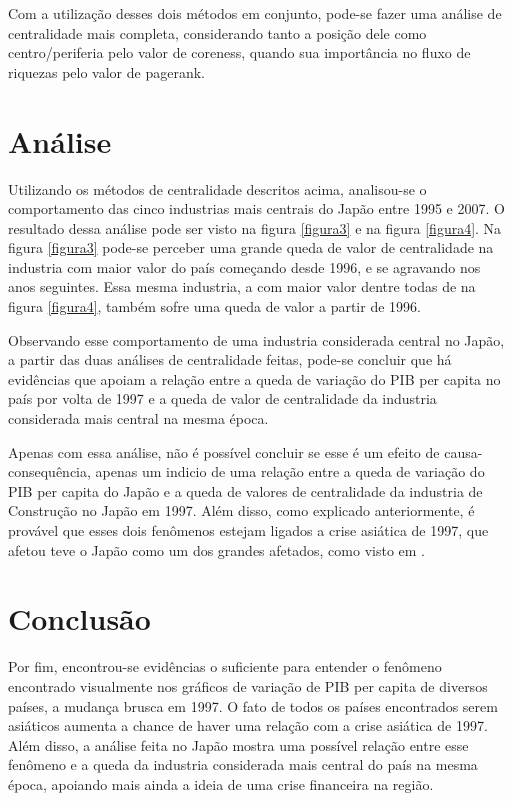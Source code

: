 \documentclass[12pt]{article}
\begin{document}
Com a utilização desses dois métodos em conjunto, pode-se fazer uma análise de centralidade mais completa, considerando tanto a posição dele como centro/periferia pelo valor de coreness, quando sua importância no fluxo de riquezas pelo valor de pagerank.

\section{Análise}

Utilizando os métodos de centralidade descritos acima, analisou-se o comportamento das cinco industrias mais centrais do Japão entre 1995 e 2007. O resultado dessa análise pode ser visto na figura \ref{figura3} e na figura \ref{figura4}. Na figura \ref{figura3} pode-se perceber uma grande queda de valor de centralidade na industria com maior valor do país começando desde 1996, e se agravando nos anos seguintes. Essa mesma industria, a com maior valor dentre todas de na figura \ref{figura4}, também sofre uma queda de valor a partir de 1996. 

Observando esse comportamento de uma industria considerada central no Japão, a partir das duas análises de centralidade feitas, pode-se concluir que há evidências que apoiam a relação entre a queda de variação do PIB per capita no país por volta de 1997 e a queda de valor de centralidade da industria considerada mais central na mesma época.

Apenas com essa análise, não é possível concluir se esse é um efeito de causa-consequência, apenas um indicio de uma relação entre a queda de variação do PIB per capita do Japão e a queda de valores de centralidade da industria de Construção no Japão em 1997. Além disso, como explicado anteriormente, é provável que esses dois fenômenos estejam ligados a crise asiática de 1997, que afetou teve o Japão como um dos grandes afetados, como visto em \cite{crise_asiatica}.

\section{Conclusão}

Por fim, encontrou-se evidências o suficiente para entender o fenômeno encontrado visualmente nos gráficos de variação de PIB per capita de diversos países, a mudança brusca em 1997. O fato de todos os países encontrados serem asiáticos aumenta a chance de haver uma relação com a crise asiática de 1997. Além disso, a análise feita no Japão mostra uma possível relação entre esse fenômeno e a queda da industria considerada mais central do país na mesma época, apoiando mais ainda a ideia de uma crise financeira na região.
\end{document}
